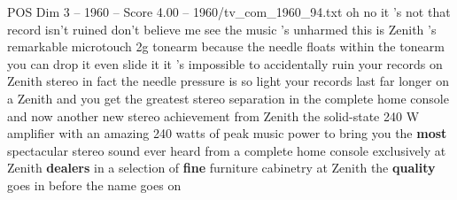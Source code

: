 \begin{textsample}{POS Dim 3 – 1960 – Score 4.00 – 1960/tv\_com\_1960\_94.txt}  \label{ex:f3_pos_023}
oh no it 's not that record isn't ruined don't believe me see the music 's unharmed this is Zenith 's remarkable microtouch 2g tonearm because the needle floats within the tonearm you can drop it even slide it it 's impossible to accidentally ruin your records on Zenith stereo in fact the needle pressure is so light your records last far longer on a Zenith and you get the greatest stereo separation in the complete home console and now another new stereo achievement from Zenith the solid-state 240 W amplifier with an amazing 240 watts of peak music power to bring you the \textbf{most} spectacular stereo sound ever heard from a complete home console exclusively at Zenith \textbf{dealers} in a selection of \textbf{fine} furniture cabinetry at Zenith the \textbf{quality} goes in before the name goes on

\end{textsample}
